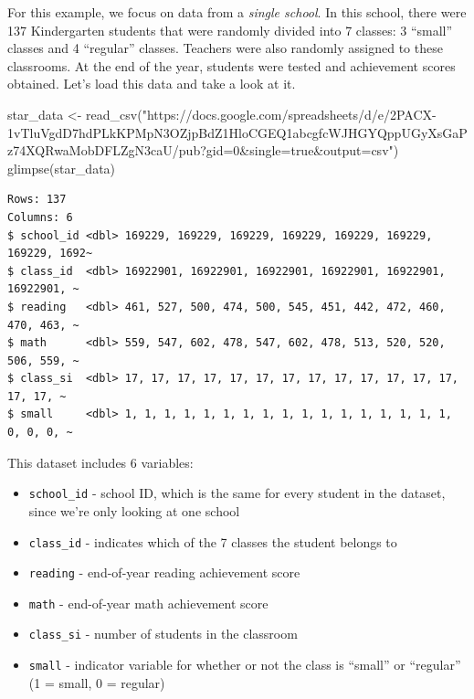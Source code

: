 \documentclass[
  letterpaper,
  DIV=11,
  numbers=noendperiod]{scrreprt}
\newenvironment{Shaded}{\begin{snugshade}}{\end{snugshade}}
\newcommand{\FunctionTok}[1]{\textcolor[rgb]{0.28,0.35,0.67}{#1}}
\newcommand{\NormalTok}[1]{\textcolor[rgb]{0.00,0.23,0.31}{#1}}
\newcommand{\OtherTok}[1]{\textcolor[rgb]{0.00,0.23,0.31}{#1}}
\newcommand{\StringTok}[1]{\textcolor[rgb]{0.13,0.47,0.30}{#1}}
\providecommand{\tightlist}{%
  \setlength{\itemsep}{0pt}\setlength{\parskip}{0pt}}\usepackage{longtable,booktabs,array}
\theoremstyle{definition}
\theoremstyle{remark}
\begin{document}
For this example, we focus on data from a \emph{single school}. In this
school, there were 137 Kindergarten students that were randomly divided
into 7 classes: 3 ``small'' classes and 4 ``regular'' classes. Teachers
were also randomly assigned to these classrooms. At the end of the year,
students were tested and achievement scores obtained. Let's load this
data and take a look at it.

\begin{Shaded}
\begin{Highlighting}[]
\NormalTok{star\_data }\OtherTok{\textless{}{-}} \FunctionTok{read\_csv}\NormalTok{(}\StringTok{"https://docs.google.com/spreadsheets/d/e/2PACX{-}1vTluVgdD7hdPLkKPMpN3OZjpBdZ1HloCGEQ1abcgfcWJHGYQppUGyXsGaPz74XQRwaMobDFLZgN3caU/pub?gid=0\&single=true\&output=csv"}\NormalTok{)}
\FunctionTok{glimpse}\NormalTok{(star\_data)}
\end{Highlighting}
\end{Shaded}

\begin{verbatim}
Rows: 137
Columns: 6
$ school_id <dbl> 169229, 169229, 169229, 169229, 169229, 169229, 169229, 1692~
$ class_id  <dbl> 16922901, 16922901, 16922901, 16922901, 16922901, 16922901, ~
$ reading   <dbl> 461, 527, 500, 474, 500, 545, 451, 442, 472, 460, 470, 463, ~
$ math      <dbl> 559, 547, 602, 478, 547, 602, 478, 513, 520, 520, 506, 559, ~
$ class_si  <dbl> 17, 17, 17, 17, 17, 17, 17, 17, 17, 17, 17, 17, 17, 17, 17, ~
$ small     <dbl> 1, 1, 1, 1, 1, 1, 1, 1, 1, 1, 1, 1, 1, 1, 1, 1, 1, 0, 0, 0, ~
\end{verbatim}

This dataset includes 6 variables:

\begin{itemize}
\tightlist
\item
  \texttt{school\_id} - school ID, which is the same for every student
  in the dataset, since we're only looking at one school
\item
  \texttt{class\_id} - indicates which of the 7 classes the student
  belongs to
\item
  \texttt{reading} - end-of-year reading achievement score
\item
  \texttt{math} - end-of-year math achievement score
\item
  \texttt{class\_si} - number of students in the classroom
\item
  \texttt{small} - indicator variable for whether or not the class is
  ``small'' or ``regular'' (1 = small, 0 = regular)
\end{itemize}
\end{document}
